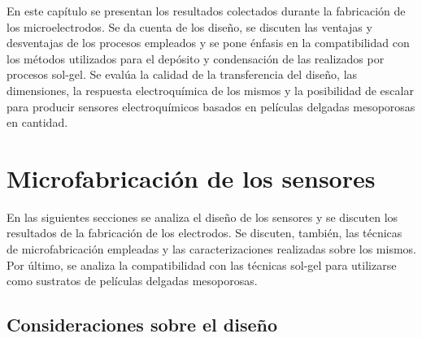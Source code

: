 	En este capítulo se presentan los resultados colectados durante la fabricación de los microelectrodos. Se da cuenta de los diseño, se discuten las ventajas y desventajas de los procesos empleados y se pone énfasis en la compatibilidad con los métodos utilizados para el depósito y condensación de las \pdm\space realizados por procesos sol-gel. Se evalúa la calidad de la transferencia del diseño, las dimensiones, la respuesta electroquímica de los mismos y la posibilidad de escalar para producir sensores electroquímicos basados en películas delgadas mesoporosas en cantidad.



	
\section{Microfabricación de los sensores}
		
	 	 En las siguientes secciones se analiza el diseño de los sensores y se discuten los resultados de la fabricación de los electrodos. Se discuten, también, las técnicas de microfabricación empleadas y las caracterizaciones realizadas sobre los mismos. Por último, se analiza la compatibilidad con las técnicas sol-gel para utilizarse como sustratos de películas delgadas mesoporosas.

  		\subsection{Consideraciones sobre el diseño}

